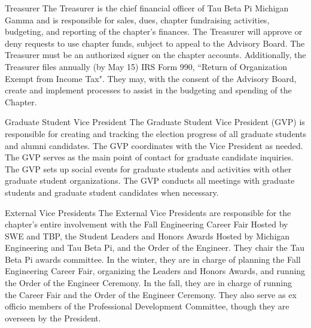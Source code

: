 \begin{enumsubsection}
\item{Treasurer}
The Treasurer is the chief financial officer of Tau Beta Pi Michigan Gamma and is responsible for sales, dues, chapter fundraising activities, budgeting, and reporting of the chapter's finances.
The Treasurer will approve or deny requests to use chapter funds, subject to appeal to the Advisory Board.
The Treasurer must be an authorized signer on the chapter accounts.
Additionally, the Treasurer files annually (by May 15) IRS Form 990, ``Return of Organization Exempt from Income Tax".
They may, with the consent of the Advisory Board, create and implement processes to assist in the budgeting and spending of the Chapter.

\item{Graduate Student Vice President}
The Graduate Student Vice President (GVP) is responsible for creating and tracking the election progress of all graduate students and alumni candidates.
The GVP coordinates with the Vice President as needed.
The GVP serves as the main point of contact for graduate candidate inquiries.
The GVP sets up social events for graduate students and activities with other graduate student organizations.
The GVP conducts all meetings with graduate students and graduate student candidates when necessary.

\item{External Vice Presidents}
The External Vice Presidents are responsible for the
chapter’s entire involvement with the Fall Engineering Career Fair Hosted by SWE and TBP, 
the Student Leaders and Honors Awards Hosted by Michigan Engineering and Tau Beta Pi, and the Order of the Engineer. 
They chair the Tau Beta Pi awards committee. In the
winter, they are in charge of planning the Fall Engineering Career Fair, organizing the Leaders
and Honors Awards, and running the Order of the Engineer Ceremony. 
In the fall, they are in charge of running the Career Fair and the Order of the Engineer Ceremony. 
They also serve as ex officio members of the Professional Development Committee, though
they are overseen by the President.
\end{enumsubsection}

